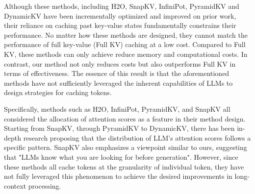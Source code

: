 Although these methods, including H2O, SnapKV, InfiniPot, PyramidKV and DynamicKV have been incrementally optimized and improved on prior work, their reliance on caching past key-value states fundamentally constrains their performance. No matter how these methods are designed, they cannot match the performance of full key-value (Full KV) caching at a low cost. Compared to Full KV, these methods can only achieve reduce memory and computational costs. In contrast, our method not only reduces costs but also outperforms Full KV in terms of effectiveness. The essence of this result is that the aforementioned methods have not sufficiently leveraged the inherent capabilities of LLMs to design strategies for caching tokens.

Specifically, methods such as H2O, InfiniPot, PyramidKV, and SnapKV all considered the allocation of attention scores as a feature in their method design. Starting from SnapKV, through PyramidKV to DynamicKV, there has been in-depth research proposing that the distribution of LLM’s attention scores follows a specific pattern. SnapKV also emphasizes a viewpoint similar to ours, suggesting that "LLMs know what you are looking for before generation". However, since these methods all cache tokens at the granularity of individual token, they have not fully leveraged this phenomenon to achieve the desired improvements in long-context processing.